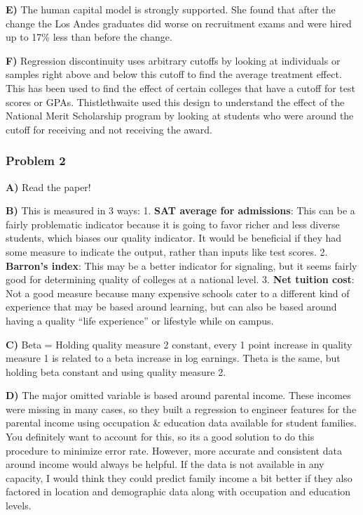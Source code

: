 \documentclass[11pt]{article}
\begin{document}
\textbf{E)} The human capital model is strongly supported. She found
that after the change the Los Andes graduates did worse on recruitment
exams and were hired up to 17\% less than before the change.

\textbf{F)} Regression discontinuity uses arbitrary cutoffs by looking
at individuals or samples right above and below this cutoff to find the
average treatment effect. This has been used to find the effect of
certain colleges that have a cutoff for test scores or GPAs.
Thistlethwaite used this design to understand the effect of the National
Merit Scholarship program by looking at students who were around the
cutoff for receiving and not receiving the award.

    \hypertarget{problem-2}{%
\subsubsection{Problem 2}\label{problem-2}}

\textbf{A)} Read the paper!

\textbf{B)} This is measured in 3 ways: 1. \textbf{SAT average for
admissions}: This can be a fairly problematic indicator because it is
going to favor richer and less diverse students, which biases our
quality indicator. It would be beneficial if they had some measure to
indicate the output, rather than inputs like test scores. 2.
\textbf{Barron's index}: This may be a better indicator for signaling,
but it seems fairly good for determining quality of colleges at a
national level. 3. \textbf{Net tuition cost}: Not a good measure because
many expensive schools cater to a different kind of experience that may
be based around learning, but can also be based around having a quality
``life experience'' or lifestyle while on campus.

\textbf{C)} Beta = Holding quality measure 2 constant, every 1 point
increase in quality measure 1 is related to a beta increase in log
earnings. Theta is the same, but holding beta constant and using quality
measure 2.

\textbf{D)} The major omitted variable is based around parental income.
These incomes were missing in many cases, so they built a regression to
engineer features for the parental income using occupation \& education
data available for student families. You definitely want to account for
this, so its a good solution to do this procedure to minimize error
rate. However, more accurate and consistent data around income would
always be helpful. If the data is not available in any capacity, I would
think they could predict family income a bit better if they also
factored in location and demographic data along with occupation and
education levels.
\end{document}
